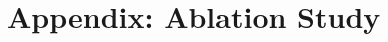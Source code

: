 \documentclass[11pt]{article}
\begin{document}


%



\appendix
\onecolumn
\section{Appendix: Ablation Study}\nopagebreak[4]
\nopagebreak
\label{sec:appendixA}
\end{document}
